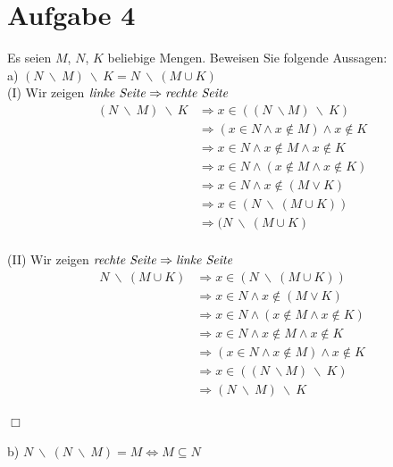 \section*{Aufgabe 4}

Es seien $M$, $N$, $K$ beliebige Mengen. Beweisen Sie folgende Aussagen:\\

a) $(N \ \backslash \ M) \ \backslash \ K = N \ \backslash \ (M \cup K)$\\

(I) Wir zeigen $\text{\textit{linke Seite}} \Rightarrow \text{\textit{rechte Seite}}$
\begin{align*}
(N \ \backslash \ M) \ \backslash \ K &\Rightarrow x \in ((N \ \backslash M) \ \backslash \ K)\\
&\Rightarrow (x \in N \land x \not \in M) \land x \not \in K\\
&\Rightarrow x \in N \land x \not \in M \land x \not \in K\\
&\Rightarrow x \in N \land (x \not \in M \land x \not \in K)\\
&\Rightarrow x \in N \land x \not \in (M \lor K)\\
&\Rightarrow x \in (N \ \backslash \ (M \cup K))\\
&\Rightarrow (N \ \backslash \ (M \cup K)\\
\end{align*}

(II) Wir zeigen $\text{\textit{rechte Seite}} \Rightarrow \text{\textit{linke Seite}}$
\begin{align*}
N \ \backslash \ (M \cup K) &\Rightarrow x \in (N \ \backslash \ (M \cup K))\\
&\Rightarrow x \in N \land x \not \in (M \lor K)\\
&\Rightarrow x \in N \land (x \not \in M \land x \not \in K)\\
&\Rightarrow x \in N \land x \not \in M \land x \not \in K\\
&\Rightarrow (x \in N \land x \not \in M) \land x \not \in K\\
&\Rightarrow x \in ((N \ \backslash M) \ \backslash \ K)\\
&\Rightarrow (N \ \backslash \ M) \ \backslash \ K
\end{align*}

\begin{FlushRight}
$\Box$
\end{FlushRight}

\newpage

b) $N \ \backslash \ (N \ \backslash \ M) = M \Leftrightarrow M \subseteq N$

